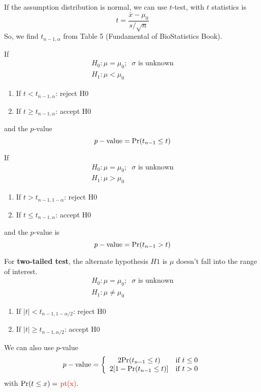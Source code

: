 If the assumption distribution is normal, we can use $t$-test, with
$t$ statistics is
\begin{equation*}
  t= \frac{\bar{x} - \mu_0} {s/\sqrt{n}}
\end{equation*}
So, we find $t_{n-1,\alpha}$ from Table 5 (Fundamental of
BioStatistics Book). 

If
\begin{equation*}
  \begin{split}
    H_0: \mu = \mu_0;\;\; \sigma \text{ is unknown}\\
    H_1: \mu < \mu_0 
  \end{split}
\end{equation*}
\begin{enumerate}
\item If $t<t_{n-1,\alpha}$: reject H0
\item If $t \ge t_{n-1,\alpha}$: accept H0
\end{enumerate}
and the $p$-value
\begin{equation}
  \label{eq:61}
  p-\text{value} = \text{Pr}(t_{n-1} \le t)
\end{equation}

If 
\begin{equation*}
  \begin{split}
    H_0: \mu = \mu_0;\;\; \sigma \text{ is unknown}\\
    H_1: \mu > \mu_0 
  \end{split}
\end{equation*}
\begin{enumerate}
\item If $t>t_{n-1,1-\alpha}$: reject H0
\item If $t \le t_{n-1,\alpha}$: accept H0
\end{enumerate}
and the $p$-value is
\begin{equation}
  \label{eq:62}
  p-\text{value} = \text{Pr}(t_{n-1} > t)
\end{equation}



For {\bf two-tailed test}, the alternate hypothesis $H1$ is $\mu$
doesn't fall into the range of interest. 
\begin{equation*}
  \begin{split}
    H_0: \mu = \mu_0;\;\; \sigma \text{ is unknown}\\
    H_1: \mu \ne \mu_0
  \end{split}
\end{equation*}
\begin{enumerate}
\item If $|t|<t_{n-1,1-\alpha/2}$: reject H0
\item If $|t| \ge t_{n-1,\alpha/2}$: accept H0
\end{enumerate}
We can also use $p$-value
\begin{equation}
  \label{eq:64}
  p-\text{value} = \left\{
      \begin{array}{cc}
        2\text{Pr}(t_{n-1}\le t) & \text{if } t \le 0 \\
        2[1-\text{Pr}(t_{n-1}\le t)] & \text{if } t > 0 \\
      \end{array}
      \right.
\end{equation}
with \textcolor{red}{ $\text{Pr}(t \le x) =$ pt(x)}.

